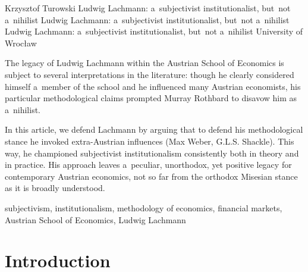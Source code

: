 \begin{artengenv}{Krzysztof Turowski}
	{Ludwig Lachmann: a~subjectivist institutionalist, but~not a~nihilist}
	{Ludwig Lachmann: a~subjectivist institutionalist, but~not a~nihilist}
	{Ludwig Lachmann: a~subjectivist institutionalist, but~not a~nihilist}
	{University of Wrocław}
	{The legacy of Ludwig Lachmann within the Austrian School of Economics is subject to several interpretations in the literature: though he clearly considered himself a~member of the school and he influenced many Austrian economists, his particular methodological claims prompted Murray Rothbard to disavow him as a~nihilist.
	
	
	
	In this article, we defend Lachmann by arguing that to defend his methodological stance he invoked extra-Austrian influences (Max Weber, G.L.S. Shackle). This way, he championed subjectivist institutionalism consistently both in theory and in practice. His approach leaves a~peculiar, unorthodox, yet positive legacy for contemporary Austrian economics, not so far from the orthodox Misesian stance as it is broadly understood.
	}
	{subjectivism, institutionalism, methodology of economics, financial markets, Austrian School of Economics, Ludwig Lachmann}





\section{Introduction}


\end{artengenv}
